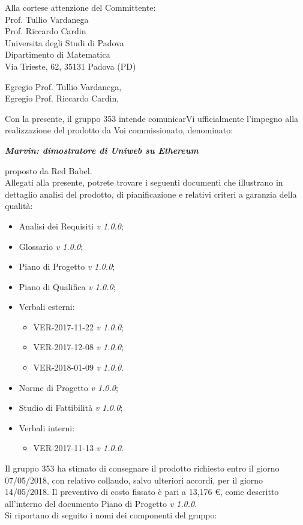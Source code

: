 \documentclass[openany, a4paper, 12pt]{letter}
\newcommand{\vruno}{\textit{v 1.0.0}\xspace} %
\begin{document}
	
	\begin{letter}{
			Alla cortese attenzione del Committente:\\
			\smallskip
			Prof. Tullio Vardanega\\
			Prof. Riccardo Cardin\\
			\medskip
			Universita degli Studi di Padova \\
			Dipartimento di Matematica\\
			Via Trieste, 62, 35131 Padova (PD)}
		\opening{Egregio Prof. Tullio Vardanega, \\
			Egregio Prof. Riccardo Cardin,}
		\thispagestyle{plain}
		Con la presente, il gruppo 353 intende comunicarVi ufficialmente l’impegno alla realizzazione del prodotto da Voi commissionato, denominato: \\
		\begin{center}
			\emph{\textbf{Marvin: dimostratore di Uniweb su Ethereum}}\medskip \\
		\end{center}
		proposto da Red Babel.\medskip\\
		Allegati alla presente, potrete trovare i seguenti documenti che illustrano in dettaglio analisi del
		prodotto, di pianificazione e relativi criteri a garanzia della qualità: 
		\begin{itemize}
			\item Analisi dei Requisiti \vruno;
			\item Glossario \vruno;
			\item Piano di Progetto \vruno;
			\item Piano di Qualifica \vruno;
			\item Verbali esterni:
			\begin{itemize}
				\item VER-2017-11-22 \vruno;
				\item VER-2017-12-08 \vruno;
				\item VER-2018-01-09 \vruno.
			\end{itemize}
			\item Norme di Progetto \vruno;
			\item Studio di Fattibilità \vruno;
			\item Verbali interni:
			\begin{itemize}
				\item VER-2017-11-13 \vruno.
			\end{itemize}
		\end{itemize}
		
		
		Il gruppo 353 ha stimato di consegnare il prodotto richiesto entro il giorno 07/05/2018,
		con relativo collaudo, salvo ulteriori accordi, per il giorno 14/05/2018. Il preventivo di costo
		fissato è pari a 13,176 \euro, come descritto all'interno del documento Piano di Progetto \vruno.
		\medskip \\
		Si riportano di seguito i nomi dei componenti del gruppo:\\
		

\end{letter}
\end{document}
